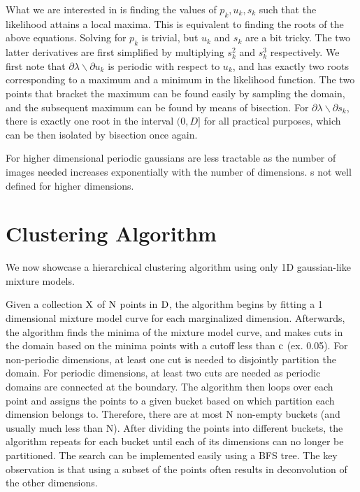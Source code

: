 \documentclass{acm_proc_article-sp}
\begin{document}
What we are interested in is finding the values of \textbf{$p_k, u_k, s_k$} such that the likelihood attains a local maxima. This is equivalent to finding the roots of the above equations. Solving for \(p_k\) is trivial, but \(u_k\) and \(s_k\) are a bit tricky.  The two latter derivatives are first simplified by multiplying \(s_k^2\) and \(s_k^3\) respectively. We first note that \(\partial \lambda \backslash \partial u_k \) is periodic with respect to \(u_k\), and has exactly two roots corresponding to a  maximum  and  a minimum in the likelihood function. The two points that bracket the maximum can be found easily by sampling the domain, and the subsequent maximum can be found by means of bisection. For \(\partial \lambda \backslash \partial s_k\), there is exactly one root in the interval \((0, D]\) for all practical purposes, which can be then isolated by bisection once again.

For higher dimensional periodic gaussians are less tractable as the number of images needed increases exponentially with the number of dimensions. s not well defined for higher dimensions. 

\section{Clustering Algorithm}

We now showcase a  hierarchical clustering algorithm using only 1D gaussian-like mixture models.

Given a collection \($X$\) of \($N$\) points in \($D$\), the algorithm begins by fitting a 1 dimensional mixture model curve for each marginalized dimension. Afterwards, the algorithm finds the minima of the mixture model curve, and makes cuts in the domain based on the minima points with a cutoff less than \($c$\) (ex. 0.05). For non-periodic dimensions, at least one cut is needed to disjointly partition the domain. For periodic dimensions, at least two cuts are needed as periodic domains are connected at the boundary. The algorithm then loops over each point and assigns the points to a given bucket based on which partition each dimension belongs to. Therefore, there are at most N non-empty buckets (and usually much less than N). After dividing the points into different buckets, the algorithm repeats for each bucket until each of its dimensions can no longer be partitioned. The search can be implemented easily using a BFS tree. The key observation is that using a subset of the points often results in deconvolution of the other dimensions.
\end{document}
